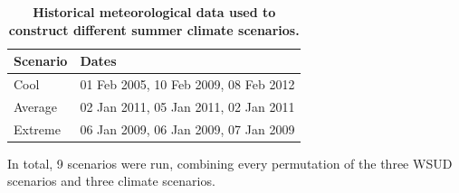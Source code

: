 \documentclass[final,3p,times,authoryear]{elsarticle}
\begin{document}
\begin{table}[!htbp]
\caption{\bf Historical meteorological data used to construct different summer climate scenarios.  \label{tab:dates}}     
\begin{tabular}{ l l}
\textbf{Scenario} & \textbf{Dates}\\ \hline
Cool & 01 Feb 2005, 10 Feb 2009, 08 Feb 2012 \\ 
Average & 02 Jan 2011, 05 Jan 2011, 02 Jan 2011 \\ 
Extreme & 06 Jan 2009, 06 Jan 2009, 07 Jan 2009 \\ 
\hline
\end{tabular}
\end{table}



In total, 9 scenarios were run, combining every permutation of the three WSUD scenarios and three climate scenarios.
\end{document}
